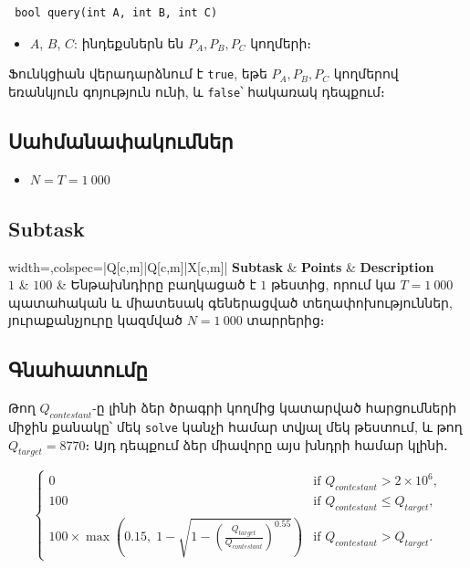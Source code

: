 \documentclass[12pt]{article}
\begin{document}
\begin{lstlisting}
 bool query(int A, int B, int C)
\end{lstlisting}
\begin{itemize}
	\item $A$, $B$, $C$: ինդեքսներն են $P_A, P_B, P_C$ կողմերի։
\end{itemize}

Ֆունկցիան վերադարձնում է \texttt{true}, եթե $P_A,P_B,P_C$ կողմերով եռանկյուն գոյություն ունի, և \texttt{false}՝ հակառակ դեպքում։

\subsection{Սահմանափակումներ}
\vspace{0.1em}
\begin{itemize}
	\item $N = T = 1~000$
\end{itemize}

\subsection{Subtask}
\begin{table}[H]
	\begin{tblr}{width=\linewidth,colspec={|Q[c,m]|Q[c,m]|X[c,m]|}}
		\hline
		\textbf{Subtask} & \textbf{Points} & \textbf{Description}\\
		\hline
		$1$ & $100$ & Ենթախնդիրը բաղկացած է $1$ թեստից, որում կա $T=1~000$ պատահական և միատեսակ գեներացված տեղափոխություններ, յուրաքանչյուրը կազմված $N=1~000$ տարրերից։  \\
		\hline
	\end{tblr}
	\caption*{Տրված ենթախնդրի համար միավորները տրվում են միայն այն դեպքում, եթե բոլոր թեստերն անցնում են։}
\end{table}
\FloatBarrier

\subsection{Գնահատումը}

Թող $Q_{contestant}$-ը լինի ձեր ծրագրի կողմից կատարված հարցումների միջին քանակը՝ մեկ \texttt{solve} կանչի համար տվյալ մեկ թեստում, և թող $Q_{target}=8770$։ Այդ դեպքում ձեր միավորը այս խնդրի համար կլինի․

\[
\begin{cases}
0 & \text{if } Q_{contestant} > 2\times 10^6, \\
100 & \text{if } Q_{contestant} \le Q_{target}, \\
100 \times \max\left(0.15,\; 1-\sqrt{1-\left(\frac{Q_{target}}{Q_{contestant}}\right)^{0.55}}\right) & \text{if } Q_{contestant} > Q_{target}.
\end{cases}
\]
\end{document}
